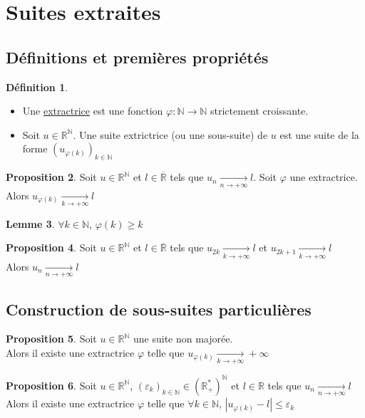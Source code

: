 \documentclass[10pt,a4paper]{article}
\theoremstyle{definition}
\newtheorem{proposition}{Proposition}[section]
\newtheorem{lemme}[proposition]{Lemme}
\newtheorem{definition}[proposition]{Définition}
\begin{document}
\section{Suites extraites}
\subsection{Définitions et premières propriétés}
\begin{definition}
\hfill
\begin{itemize}
\item Une \uline{extractrice} est une fonction $\varphi: \mathbb{N} \to \mathbb{N}$ strictement croissante.
\item Soit $u \in \mathbb{R}^\mathbb{N}$. Une suite extrictrice (ou une sous-suite) de $u$ est une suite de la forme $\left(u_{\varphi(k)}\right)_{k \in \mathbb{N}}$
\end{itemize}
\end{definition}
\begin{proposition}
Soit $u \in \mathbb{R}^\mathbb{N}$ et $l \in \overline{\mathbb{R}}$ tels que $u_n \xrightarrow[n \to +\infty]{} l$. Soit $\varphi$ une extractrice. \\
Alors $u_{\varphi(k)} \xrightarrow[k \to +\infty]{} l$
\end{proposition}
\begin{lemme}
$\forall k \in \mathbb{N}$, $\varphi(k) \geq k$
\end{lemme}
\begin{proposition}
Soit $u \in \mathbb{R}^\mathbb{N}$ et $l \in \overline{\mathbb{R}}$ tels que $u_{2k} \xrightarrow[k \to +\infty]{} l$ et $u_{2k + 1} \xrightarrow[k \to +\infty]{} l$ \\
Alors $u_n \xrightarrow[n \to +\infty]{} l$
\end{proposition}

\subsection{Construction de sous-suites particulières}
\begin{proposition}
Soit $u \in \mathbb{R}^\mathbb{N}$ une suite non majorée. \\
Alors il existe une extractrice $\varphi$ telle que $u_{\varphi(k)} \xrightarrow[k \to +\infty]{} +\infty$
\end{proposition}
\begin{proposition}
Soit $u \in \mathbb{R}^\mathbb{N}$, $\left(\varepsilon_k\right)_{k \in \mathbb{N}} \in \left(\mathbb{R}_+^*\right)^\mathbb{N}$ et $l \in \mathbb{R}$ tels que $u_n \xrightarrow[n \to +\infty]{} l$ \\
Alors il existe une extractrice $\varphi$ telle que $\forall k \in \mathbb{N}$, $\left| u_{\varphi(k)} - l \right| \leq \varepsilon_k$
\end{proposition}
\end{document}
